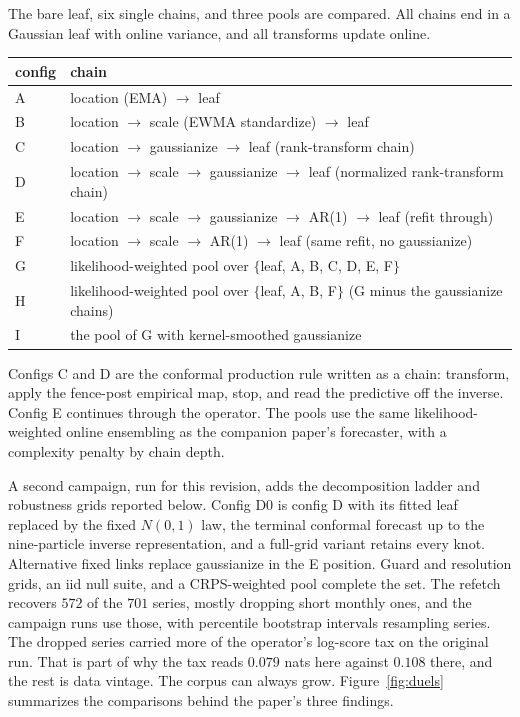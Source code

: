 \documentclass[11pt]{article}
\theoremstyle{remark}
\begin{document}
The bare leaf, six single chains, and three pools are compared. All chains end in a Gaussian leaf with
online variance, and all transforms update online.

\begin{center}
\small
\begin{tabular}{ll}
\toprule
config & chain \\
\midrule
A & location (EMA) $\to$ leaf \\
B & location $\to$ scale (EWMA standardize) $\to$ leaf \\
C & location $\to$ gaussianize $\to$ leaf \quad (rank-transform chain) \\
D & location $\to$ scale $\to$ gaussianize $\to$ leaf \quad (normalized rank-transform chain) \\
E & location $\to$ scale $\to$ gaussianize $\to$ AR(1) $\to$ leaf \quad (refit through) \\
F & location $\to$ scale $\to$ AR(1) $\to$ leaf \quad (same refit, no gaussianize) \\
G & likelihood-weighted pool over $\{$leaf, A, B, C, D, E, F$\}$ \\
H & likelihood-weighted pool over $\{$leaf, A, B, F$\}$ \quad (G minus the gaussianize chains) \\
I & the pool of G with kernel-smoothed gaussianize \\
\bottomrule
\end{tabular}
\end{center}

Configs C and D are the conformal production rule written as a chain: transform, apply the
fence-post empirical map, stop, and read the predictive off the inverse. Config E continues
through the operator. The pools use the same likelihood-weighted online ensembling as the
companion paper's forecaster, with a complexity penalty by chain depth.

A second campaign, run for this revision, adds the decomposition ladder and robustness
grids reported below. Config D0 is config D with its fitted leaf replaced by the fixed $N(0,1)$ law, the
terminal conformal forecast up to the nine-particle inverse representation, and a
full-grid variant retains every knot. Alternative fixed links replace gaussianize in the E position. Guard and
resolution grids, an iid null suite, and a CRPS-weighted pool complete the set. The
refetch recovers $572$ of the $701$ series, mostly dropping short monthly ones, and
the campaign runs use those, with percentile bootstrap intervals resampling series.
The dropped series carried more of the operator's log-score tax on the original
run. That is part of why the tax reads $0.079$ nats here against $0.108$ there, and
the rest is data vintage. The corpus can always grow.
Figure~\ref{fig:duels} summarizes the comparisons behind the paper's three findings.
\end{document}
